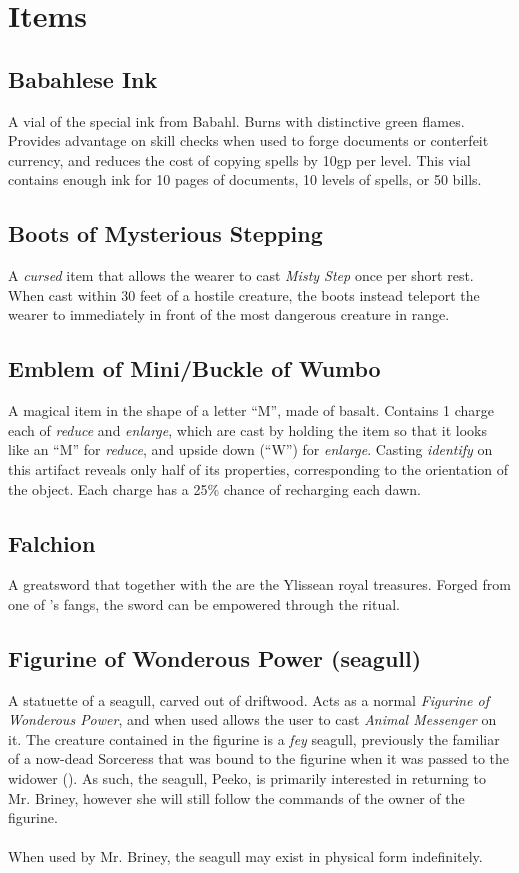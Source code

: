 \section{Items}
\subsection{Babahlese Ink}
\label{items:ink}
A vial of the special ink from Babahl. Burns with distinctive green flames. Provides advantage on skill checks when used to forge documents or conterfeit currency, and reduces the cost of copying spells by 10gp per level. This vial contains enough ink for 10 pages of documents, 10 levels of spells, or 50 bills.

\subsection{Boots of Mysterious Stepping}
\label{items:boots}
A \textit{cursed} item that allows the wearer to cast \textit{Misty Step} once per short rest. When cast within 30 feet of a hostile creature, the boots instead teleport the wearer to immediately in front of the most dangerous creature in range.

\subsection{Emblem of Mini/Buckle of Wumbo}
\label{items:wumbo}
A magical item in the shape of a letter ``M'', made of basalt. Contains 1 charge each of \textit{reduce} and \textit{enlarge}, which are cast by holding the item so that it looks like an ``M'' for \textit{reduce}, and upside down (``W'') for \textit{enlarge}. Casting \textit{identify} on this artifact reveals only half of its properties, corresponding to the orientation of the object. Each charge has a 25\% chance of recharging each dawn.

\subsection{Falchion}
\label{items:falchion}
A greatsword that together with the  are the Ylissean royal treasures. Forged from one of  's fangs, the sword can be empowered through the  ritual.

\subsection{Figurine of Wonderous Power (seagull)}
\label{items:peeko}
A statuette of a seagull, carved out of driftwood. Acts as a normal \textit{Figurine of Wonderous Power}, and when used allows the user to cast \textit{Animal Messenger} on it. The creature contained in the figurine is a \textit{fey} seagull, previously the familiar of a now-dead Sorceress that was bound to the figurine when it was passed to the widower (). As such, the seagull, Peeko, is primarily interested in returning to Mr. Briney, however she will still follow the commands of the owner of the figurine.\\
\\
When used by Mr. Briney, the seagull may exist in physical form indefinitely.

